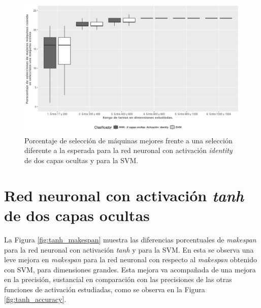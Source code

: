 \begin{figure}[H]
  \centering
  \includegraphics[width=\columnwidth]{imagenes/identity/4_porcentaje_maquinas_mejores_ann_2_capas_ocultas_identity.png}
  \caption{Porcentaje de selección de máquinas mejores frente a una selección diferente a la esperada para la red neuronal con activación \textit{identity} de dos capas ocultas y para la SVM.}
  \label{fig:identity_mejores}
\end{figure}

\newpage %

\section{Red neuronal con activación \textit{tanh} de dos capas ocultas}

La Figura \ref{fig:tanh_makespan} muestra las diferencias porcentuales de \textit{makespan} para la red neuronal con activación \textit{tanh} y para la SVM.
En esta se observa una leve mejora en \textit{makespan} para la red neuronal con respecto al \textit{makespan} obtenido con SVM, para dimensiones grandes.
Esta mejora va acompañada de una mejora en la precisión, sustancial en comparación con las precisiones de las otras funciones de activación estudiadas, como se observa en la Figura \ref{fig:tanh_accuracy}.

